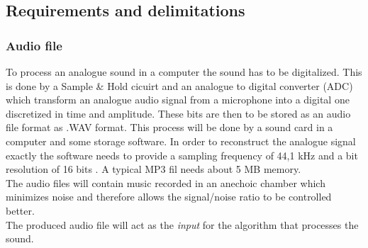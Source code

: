         
\subsection{Requirements and delimitations}
\subsubsection{Audio file}
To process an analogue sound in a computer the sound has to be digitalized. This is done by a Sample \& Hold cicuirt and an analogue to digital converter (ADC) which transform an analogue audio signal from a microphone into a digital one discretized in time and amplitude. These bits are then to be stored as an audio file format as .WAV format. This process will be done by a sound card in a computer and some storage software. In order to reconstruct the analogue signal exactly the software needs to provide a sampling frequency of 44,1 kHz and a bit resolution of 16 bits \cite{Mic}. A typical MP3 fil needs about 5 MB memory. \\
The audio files will contain music recorded in an anechoic chamber which minimizes noise and therefore allows the signal/noise ratio to be controlled better.\\      
The produced audio file will act as the \textit{input} for the algorithm that processes the sound. 

